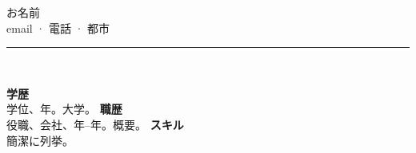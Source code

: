 \documentclass[11pt,a4paper]{article}
\begin{document}
\begin{center}
\vspace{0.5cm}
{\LARGE お名前}\\[0.8em]
email \quad · \quad 電話 \quad · \quad 都市\\[0.6em]
\rule{1.8cm}{2.2cm}\\[0.6em]
\end{center}
\vspace{1em}
\textbf{学歴}\\
学位、年。大学。
\vspace{0.8em}
\textbf{職歴}\\
役職、会社、年--年。概要。
\vspace{0.8em}
\textbf{スキル}\\
簡潔に列挙。
\end{document}
